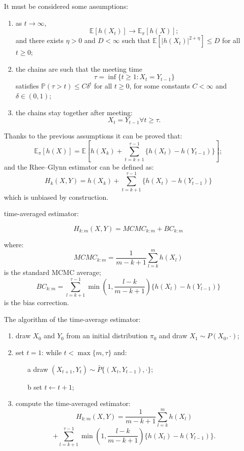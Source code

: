 \documentclass[twoside,twocolumn]{article}
\begin{document}
It must be considered some assumptions:
\begin{enumerate}
	\item as $t \to \infty$, 
	$$ \mathbb E [h(X_t)] \to \mathbb E_\pi [h(X)];$$
	and there exists $\eta > 0$ and $D < \infty$ such that $\mathbb E [|h(X_t)|^{2 + \eta}] \leq D$ for all $t \geq 0$;
	
	
	\item the chains are such that the meeting time 
	$$
	\tau 
	= \inf\{t \geq 1 : X_t = Y_{t-1}\}
	$$ 
	satisfies $\mathbb{P}(\tau > t) \leq C \delta^t$ for all $t \geq 0$, for some constants $C < \infty$ and $\delta \in (0,1)$;
	
	
	\item the chains stay together after meeting:
	$$X_t = Y_{t-1}  \forall t \geq \tau.$$
\end{enumerate}

Thanks to the previous assumptions it can be proved that:
$$\mathbb{E}_{\pi}[h(X)] = \mathbb{E}[
h(X_k) + \sum_{t = k+1}^{\tau -1}\{h(X_t) - h(Y_{t-1})\} ]
;$$
and  the Rhee--Glynn estimator can be defined as:
$$ 
H_k(X,Y)
= h(X_k) + \sum_{t = k+1}^{\tau -1}\{h(X_t) - h(Y_{t-1})\} 
$$
which is unbiased by construction.



time-averaged estimator:

$$
H_{k:m}(X,Y) = MCMC_{k:m} + BC_{k:m} $$





where:
$$MCMC_{k:m}=\frac{1}{m-k+1}\sum_{l=k}^{m}h(X_l)$$  is the standard MCMC average;
 \small{$$BC_{k:m}=\sum_{l=k+1}^{\tau -1}\min(1, \frac{l-k}{m-k+1})\{h(X_l)-h(Y_{l-1})\} $$} is the bias correction.

The algorithm of the time-average estimator:
\begin{enumerate}
	\item draw $X_0$ and $Y_0$ from an initial distribution $\pi_0$ and draw $X_1 \sim P(X_0, \cdot)$;
	\item set $t=1$: while $t<\max\{m,\tau\}$ and:
	\begin{itemize}
		\item[a] draw $(X_{t+1}, Y_t)\sim \bar P \{(X_t, Y_{t-1}), \cdot \}$; %
		\item[b] set $t \leftarrow t+1$;
	\end{itemize}
	\item compute the time-averaged estimator:	 	$$
		H_{k:m}(X,Y)
		= \frac{1}{m-k+1}\sum_{l=k}^{m}h(X_l) $$
		$$
		+ \sum_{l=k+1}^{\tau -1}\min(1, \frac{l-k}{m-k+1})\{h(X_l)-h(Y_{l-1})\} .
		$$
	
\end{enumerate}
\end{document}
